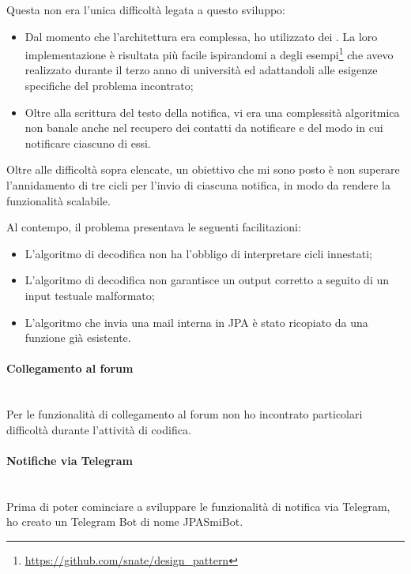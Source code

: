 Questa non era l'unica difficoltà legata a questo sviluppo:

\begin{itemize}
\item Dal momento che l'architettura era complessa, ho utilizzato dei
  . La loro implementazione è risultata più facile
  ispirandomi a degli
  esempi\footnote{\url{https://github.com/snate/design_pattern}} che
  avevo realizzato durante il terzo anno di università ed adattandoli alle
  esigenze specifiche del problema incontrato;
\item Oltre alla scrittura del testo della notifica, vi era una complessità
  algoritmica non banale anche nel recupero dei contatti da notificare e del
  modo in cui notificare ciascuno di essi.
\end{itemize}

Oltre alle difficoltà sopra elencate, un obiettivo che mi sono posto è non
superare l'annidamento di tre cicli per l'invio di ciascuna notifica, in modo
da rendere la funzionalità scalabile.

Al contempo, il problema presentava le seguenti facilitazioni:

\begin{itemize}
\item L'algoritmo di decodifica non ha l'obbligo di interpretare cicli
  innestati;
\item L'algoritmo di decodifica non garantisce un output corretto a seguito di
  un input testuale malformato;
\item L'algoritmo che invia una mail interna in JPA è stato ricopiato da una
  funzione già esistente.
\end{itemize}

\paragraph{Collegamento al forum} \mbox{} \\

Per le funzionalità di collegamento al forum non ho incontrato particolari
difficoltà durante l'attività di codifica.

\paragraph{Notifiche via Telegram} \mbox{} \\

Prima di poter cominciare a sviluppare le funzionalità di notifica via
Telegram, ho creato un Telegram Bot di nome JPASmiBot.

